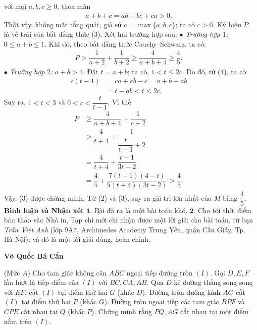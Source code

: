 \begin{multicols}{2}
	với mọi $a, b, c \ge  0$, thỏa mãn
	\begin{align*}
		a + b + c = ab + bc + ca > 0. \tag{$4$}
	\end{align*}
	Thật vậy, không mất tổng quát, giả sử \linebreak$c = \max\{a,b,c\}$;  ta có $c > 0$.
	\vskip 0.05cm
	Ký hiệu $P$ là vế trái của bất đẳng thức ($3$).
	\vskip 0.05cm
	Xét hai trường hợp sau:
	\vskip 0.05cm
	$\bullet$ \textit{Trường hợp $1$:} $0 \le a + b \le 1$.
	\vskip 0.05cm
	Khi đó, theo bất đẳng thức Cauchy--Schwarz, ta có:
	\begin{align*}
		P > \dfrac{1}{{a + 2}} + \dfrac{1}{{b + 2}} \ge \dfrac{4}{{a + b + 4}} \ge \dfrac{4}{5}.
	\end{align*}
	$\bullet$ \textit{Trường hợp $2$:} $a + b > 1$.
	\vskip 0.05cm
	Đặt $t = a + b$; ta có, $1 < t \le 2c$. Do đó, từ ($4$), ta có:
	\begin{align*}
		c(t - 1) &= ca + cb - c = a + b - ab \\
		&= t - ab < t \le 2c.
	\end{align*}
	Suy ra, $1 < t < 3$ và $0 < c < \dfrac{t}{t-1}$.  
	Vì thế
	\begin{align*}
		P &\ge \dfrac{4}{a + b + 4} + \dfrac{1}{c + 2}\\
		 &> \dfrac{4}{t + 4} + \dfrac{1}{\dfrac{t}{t-1} + 2}\\
		 &= \dfrac{4}{t + 4} + \dfrac{t-1}{3t - 2}\\
		 &= \dfrac{4}{5} + \dfrac{7(t-1)(4-t)}{5(t+4)(3t-2)}>\dfrac{4}{5}.
	\end{align*}
	Vậy, ($3$) được chứng minh.
	\vskip 0.05cm
	Từ ($2$) và ($3$), suy ra giá trị lớn nhất của $M$ bằng $\dfrac{4}{5}$.
	\vskip 0.05cm 
	\textbf{\color{thachthuctoanhoc}Bình luận và Nhận xét}
	\vskip 0.05cm
	$\pmb{1.}$ Bài đã ra là một bài toán khó.
	\vskip 0.05cm
	$\pmb{2.}$ Cho tới thời điểm bản thảo vào Nhà in, Tạp chí mới chỉ nhận được một lời giải cho bài toán, từ bạn \textit{Trần Việt Anh} (lớp $9$A$7$, Archimedes Academy Trung Yên, quận Cầu Giấy, Tp. Hà Nội); và đó là một lời giải đúng, hoàn chỉnh.
	\begin{flushright}
		\textbf{\color{thachthuctoanhoc}Võ Quốc Bá Cẩn}
	\end{flushright}
	{}
	(Mức $A$) Cho tam giác không cân $ABC$ ngoại tiếp đường tròn $(I)$. Gọi $D,E,F$ lần lượt là tiếp điểm của $(I)$ với $BC,CA,AB$. Qua $D$ kẻ đường thẳng song song với $EF$, cắt $(I)$ tại điểm thứ hai $G$ (khác $D$). Đường tròn đường kính $AG$ cắt $(I)$ tại điểm thứ hai $P$ (khác $G$). Đường tròn ngoại tiếp các tam giác $BPF$ và $CPE$ cắt nhau tại $Q$ (khác $P$). Chứng minh rằng $PQ,AG$ cắt nhau tại một điểm nằm trên $(I)$. 

\end{multicols}
